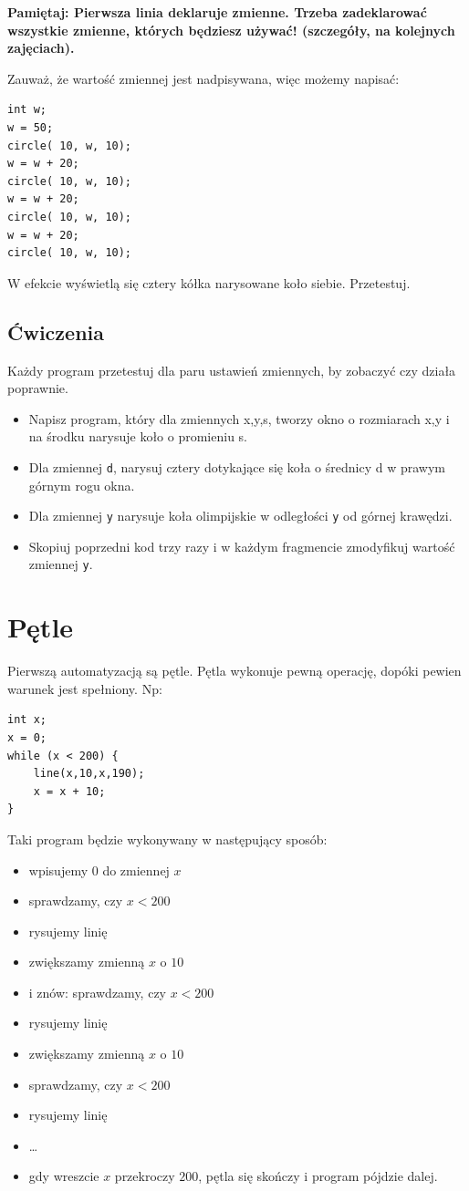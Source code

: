 \documentclass[landscape]{article}
\newcommand{\red}{\color{Red}}
\begin{document}
{\bf {\red Pamiętaj:} Pierwsza linia deklaruje zmienne. Trzeba zadeklarować wszystkie zmienne, których będziesz używać! (szczegóły, na kolejnych zajęciach).}

Zauważ, że wartość zmiennej jest nadpisywana, więc możemy napisać:
\begin{verbatim}
int w;
w = 50;
circle( 10, w, 10);
w = w + 20;
circle( 10, w, 10);
w = w + 20;
circle( 10, w, 10);
w = w + 20;
circle( 10, w, 10);
\end{verbatim}
W efekcie wyświetlą się cztery kółka narysowane koło siebie. Przetestuj.
\subsection*{Ćwiczenia}
Każdy program przetestuj dla paru ustawień zmiennych, by zobaczyć czy działa poprawnie.
\begin{itemize}
\item Napisz program, który dla zmiennych x,y,s, tworzy okno o rozmiarach x,y i na środku narysuje koło o promieniu s.
\item Dla zmiennej {\tt d}, narysuj cztery dotykające się koła o średnicy d w prawym górnym rogu okna.
\item Dla zmiennej {\tt y} narysuje koła olimpijskie w odległości {\tt y} od górnej krawędzi.
\item Skopiuj poprzedni kod trzy razy i w każdym fragmencie zmodyfikuj wartość zmiennej {\tt y}.
\end{itemize}

\section{Pętle}
Pierwszą automatyzacją są pętle. Pętla wykonuje pewną operację, dopóki pewien warunek jest spełniony. Np:
\begin{verbatim}
int x;
x = 0;
while (x < 200) {
    line(x,10,x,190);
    x = x + 10;
}
\end{verbatim}
Taki program będzie wykonywany w następujący sposób:
\begin{itemize}
\item wpisujemy $0$ do zmiennej $x$
\item sprawdzamy, czy $x<200$
\item rysujemy linię
\item zwiększamy zmienną $x$ o $10$
\item i znów: sprawdzamy, czy $x<200$
\item rysujemy linię
\item zwiększamy zmienną $x$ o $10$
\item sprawdzamy, czy $x<200$
\item rysujemy linię
\item \ldots
\item gdy wreszcie $x$ przekroczy $200$, pętla się skończy i program pójdzie dalej.
\end{itemize}
\end{document}
